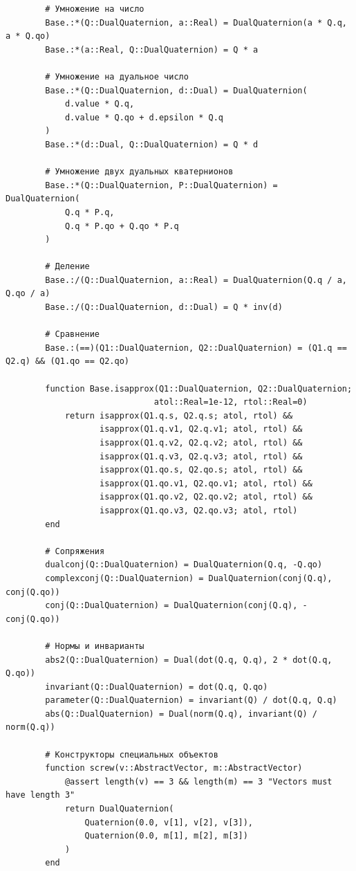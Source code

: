 \begin{verbatim}
        # Умножение на число
        Base.:*(Q::DualQuaternion, a::Real) = DualQuaternion(a * Q.q, a * Q.qo)
        Base.:*(a::Real, Q::DualQuaternion) = Q * a

        # Умножение на дуальное число
        Base.:*(Q::DualQuaternion, d::Dual) = DualQuaternion(
            d.value * Q.q,
            d.value * Q.qo + d.epsilon * Q.q
        )
        Base.:*(d::Dual, Q::DualQuaternion) = Q * d

        # Умножение двух дуальных кватернионов
        Base.:*(Q::DualQuaternion, P::DualQuaternion) = DualQuaternion(
            Q.q * P.q,
            Q.q * P.qo + Q.qo * P.q
        )

        # Деление
        Base.:/(Q::DualQuaternion, a::Real) = DualQuaternion(Q.q / a, Q.qo / a)
        Base.:/(Q::DualQuaternion, d::Dual) = Q * inv(d)

        # Сравнение
        Base.:(==)(Q1::DualQuaternion, Q2::DualQuaternion) = (Q1.q == Q2.q) && (Q1.qo == Q2.qo)

        function Base.isapprox(Q1::DualQuaternion, Q2::DualQuaternion;
                              atol::Real=1e-12, rtol::Real=0)
            return isapprox(Q1.q.s, Q2.q.s; atol, rtol) &&
                   isapprox(Q1.q.v1, Q2.q.v1; atol, rtol) &&
                   isapprox(Q1.q.v2, Q2.q.v2; atol, rtol) &&
                   isapprox(Q1.q.v3, Q2.q.v3; atol, rtol) &&
                   isapprox(Q1.qo.s, Q2.qo.s; atol, rtol) &&
                   isapprox(Q1.qo.v1, Q2.qo.v1; atol, rtol) &&
                   isapprox(Q1.qo.v2, Q2.qo.v2; atol, rtol) &&
                   isapprox(Q1.qo.v3, Q2.qo.v3; atol, rtol)
        end

        # Сопряжения
        dualconj(Q::DualQuaternion) = DualQuaternion(Q.q, -Q.qo)
        complexconj(Q::DualQuaternion) = DualQuaternion(conj(Q.q), conj(Q.qo))
        conj(Q::DualQuaternion) = DualQuaternion(conj(Q.q), -conj(Q.qo))

        # Нормы и инварианты
        abs2(Q::DualQuaternion) = Dual(dot(Q.q, Q.q), 2 * dot(Q.q, Q.qo))
        invariant(Q::DualQuaternion) = dot(Q.q, Q.qo)
        parameter(Q::DualQuaternion) = invariant(Q) / dot(Q.q, Q.q)
        abs(Q::DualQuaternion) = Dual(norm(Q.q), invariant(Q) / norm(Q.q))

        # Конструкторы специальных объектов
        function screw(v::AbstractVector, m::AbstractVector)
            @assert length(v) == 3 && length(m) == 3 "Vectors must have length 3"
            return DualQuaternion(
                Quaternion(0.0, v[1], v[2], v[3]),
                Quaternion(0.0, m[1], m[2], m[3])
            )
        end


\end{verbatim}
